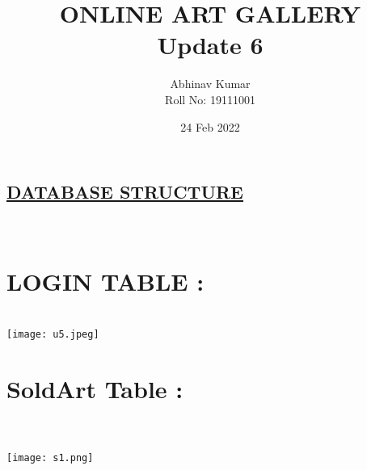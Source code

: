 \documentclass{article}
\title{ONLINE ART GALLERY \\ Update 6}
\date{24 Feb 2022}
\author{Abhinav Kumar \\ Roll No: 19111001 }
\begin{document}
\maketitle
\begin{center}
   \section*{\underline{\textbf{DATABASE STRUCTURE}}} 
\end{center}
\\
\section*{LOGIN TABLE : }
\\
\texttt{[image: u5.jpeg]}
\section*{SoldArt Table : }
\\
\\
\texttt{[image: s1.png]}
\end{document}
